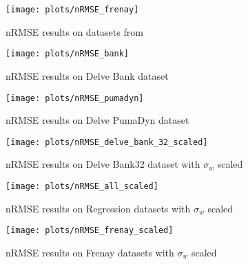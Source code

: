 \begin{figure}
    \texttt{[image: plots/nRMSE\_frenay]}
    \caption{nRMSE results on datasets from \cite{frenayParameterinsensitiveKernelExtreme2011}}
\end{figure}

\begin{figure}
    \texttt{[image: plots/nRMSE\_bank]}
    \caption{nRMSE results on Delve Bank dataset}
\end{figure}

\begin{figure}
    \texttt{[image: plots/nRMSE\_pumadyn]}
    \caption{nRMSE results on Delve PumaDyn dataset}
\end{figure}

\begin{figure}
    \texttt{[image: plots/nRMSE\_delve\_bank\_32\_scaled]}
    \caption{nRMSE results on Delve Bank32 dataset with $\sigma_w$ scaled}
\end{figure}

\begin{figure}
    \texttt{[image: plots/nRMSE\_all\_scaled]}
    \caption{nRMSE results on Regression datasets with $\sigma_w$ scaled}
\end{figure}

\begin{figure}
    \texttt{[image: plots/nRMSE\_frenay\_scaled]}
    \caption{nRMSE results on Frenay datasets with $\sigma_w$ scaled}
\end{figure}
